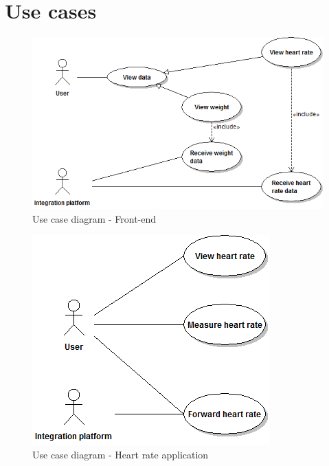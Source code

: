 \section{Use cases}

\begin{figure}
\begin{center}
\includegraphics[scale=0.6]{../Figures/use-case-diagram-front-end.png}
\end{center}
\caption{Use case diagram - Front-end}
\label{figure:use-case-diagram-front-end}
\end{figure}

\begin{figure}
\begin{center}
\includegraphics[scale=0.6]{../Figures/use-case-diagram-heart-rate.png}
\end{center}
\caption{Use case diagram - Heart rate application}
\label{figure:use-case-diagram-heart-rate}
\end{figure}

